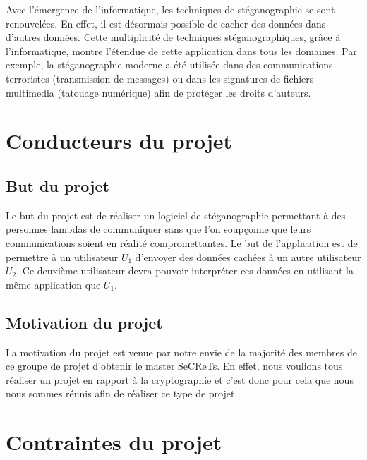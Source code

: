 \documentclass[11pt]{article}
\begin{document}
Avec l'émergence de l'informatique, les techniques de stéganographie se sont
renouvelées. En effet, il est désormais possible de cacher des données dans
d'autres données. Cette multiplicité de techniques stéganographiques, grâce à
l'informatique, montre l'étendue de cette application dans tous les domaines.
Par exemple, la stéganographie moderne a été utilisée dans des communications
terroristes (transmission de messages) ou dans les signatures de fichiers
multimedia (tatouage numérique) afin de protéger les droits d'auteurs. 

\section{Conducteurs du projet}

\subsection{But du projet}

Le but du projet est de réaliser un logiciel de stéganographie permettant à des
personnes lambdas de communiquer sans que l'on soupçonne que leurs
communications soient en réalité compromettantes. Le but de l'application est
de permettre à un utilisateur $U_1$ d'envoyer des données cachées à un autre
utilisateur $U_2$. Ce deuxième utilisateur devra pouvoir interpréter ces données
en utilisant la même application que $U_1$. 

\subsection{Motivation du projet}

La motivation du projet est venue par notre envie de la majorité des membres de
ce groupe de projet d'obtenir le master SeCReTs. En effet, nous voulions tous
réaliser un projet en rapport à la cryptographie et c'est donc pour cela que
nous nous sommes réunis afin de réaliser ce type de projet. 

\section{Contraintes du projet}


\end{document}
